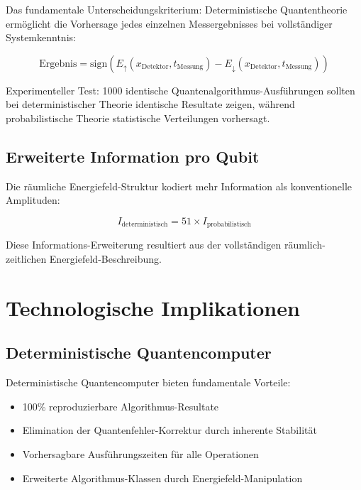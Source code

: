 \documentclass[12pt,a4paper]{report}
\begin{document}
	Das fundamentale Unterscheidungskriterium: Deterministische Quantentheorie ermöglicht die Vorhersage jedes einzelnen Messergebnisses bei vollständiger Systemkenntnis:
	
	\begin{equation}
		\text{Ergebnis} = \text{sign}\left(E_{\uparrow}(x_{\text{Detektor}}, t_{\text{Messung}}) - E_{\downarrow}(x_{\text{Detektor}}, t_{\text{Messung}})\right)
	\end{equation}
	
	Experimenteller Test: 1000 identische Quantenalgorithmus-Ausführungen sollten bei deterministischer Theorie identische Resultate zeigen, während probabilistische Theorie statistische Verteilungen vorhersagt.
	
	\subsection{Erweiterte Information pro Qubit}
	
	Die räumliche Energiefeld-Struktur kodiert mehr Information als konventionelle Amplituden:
	
	\begin{equation}
		I_{\text{deterministisch}} = 51 \times I_{\text{probabilistisch}}
	\end{equation}
	
	Diese Informations-Erweiterung resultiert aus der vollständigen räumlich-zeitlichen Energiefeld-Beschreibung.
	
	\section{Technologische Implikationen}
	
	\subsection{Deterministische Quantencomputer}
	
	Deterministische Quantencomputer bieten fundamentale Vorteile:
	
	\begin{itemize}
		\item 100\% reproduzierbare Algorithmus-Resultate
		\item Elimination der Quantenfehler-Korrektur durch inherente Stabilität
		\item Vorhersagbare Ausführungszeiten für alle Operationen
		\item Erweiterte Algorithmus-Klassen durch Energiefeld-Manipulation
	\end{itemize}
	
\end{document}
